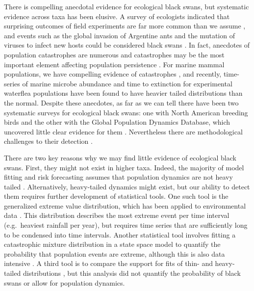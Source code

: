 There is compelling anecdotal evidence for ecological black swans, but
systematic evidence across taxa has been elusive. A survey of ecologists
indicated that surprising outcomes of field experiments are far more common
than we assume \citep{doak2008}, and events such as the global invasion of
Argentine ants and the mutation of viruses to infect new hosts could be
considered black swans \citep{nunez2012}. In fact, anecdotes of population
catastrophes are numerous and catastrophes may be the most important element
affecting population persistence \citep{mangel1994}. For marine mammal
populations, we have compelling evidence of catastrophes \citep{gerber2001,
  ward2007}, and recently, time-series of marine microbe abundance
\citep{segura2013} and time to extinction for experimental waterflea
populations \citep{drake2014} have been found to have heavier tailed
distributions than the normal. Despite these anecdotes, as far as we can tell
there have been two systematic surveys for ecological black swans: one with
North American breeding birds and the other with the Global Population
Dynamics Database, which uncovered little clear evidence for them
\citep{keitt1998,allen2001,halley2002}. Nevertheless there are methodological
challenges to their detection \citep{allen2001,ward2007}.

There are two key reasons why we may find little evidence of ecological black
swans. First, they might not exist in higher taxa. Indeed, the majority of
model fitting and risk forecasting assumes that population dynamics are not
heavy tailed \citep[e.g.][]{brook2006a,dennis2006,knape2012}. Alternatively,
heavy-tailed dynamics might exist, but our ability to detect them requires
further development of statistical tools. One such tool is the generalized
extreme value distribution, which has been applied to environmental data
\citep[e.g.][]{katz2005}. This distribution describes the most extreme event
per time interval (e.g.~heaviest rainfall per year), but requires time series
that are sufficiently long to be condensed into time intervals. Another
statistical tool involves fitting a catastrophic mixture distribution in a
state space model to quantify the probability that population events are
extreme, although this is also data intensive \citep{ward2007}. A third tool is
to compare the support for fits of thin- and heavy-tailed distributions
\citep{halley2002}, but this analysis did not quantify the probability of black
swans or allow for population dynamics.


